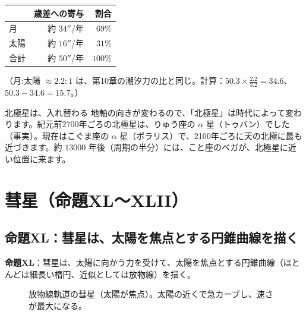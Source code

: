 \documentclass[a4paper,11pt,openany]{ltjsbook}
\begin{document}
\begin{center}
\begin{tabular}{lrr}
\toprule
 & 歳差への寄与 & 割合\\
\midrule
月 & 約 $34''$/年 & $69\%$\\
太陽 & 約 $16''$/年 & $31\%$\\
合計 & 約 $50''$/年 & $100\%$\\
\bottomrule
\end{tabular}
\end{center}

（月:太陽 $\approx2.2:1$ は、第10章の潮汐力の比と同じ。計算：$50.3\times\frac{2.2}{3.2}=34.6$、$50.3-34.6=15.7$。）

\begin{examplebox}{北極星は、入れ替わる}
地軸の向きが変わるので、「北極星」は時代によって変わります。紀元前2700年ごろの北極星は、りゅう座の $\alpha$ 星（トゥバン）でした（事実）。現在はこぐま座の $\alpha$ 星（ポラリス）で、2100年ごろに天の北極に最も近づきます。約 $13000$ 年後（周期の半分）には、こと座のベガが、北極星に近い位置に来ます。
\end{examplebox}

\section{彗星（命題XL〜XLII）}

\subsection{命題XL：彗星は、太陽を焦点とする円錐曲線を描く}

\textbf{命題XL}：彗星は、太陽に向かう力を受けて、太陽を焦点とする円錐曲線（ほとんどは細長い楕円、近似としては放物線）を描く。

\begin{figure}[htbp]
\centering
{}
\caption{放物線軌道の彗星（太陽が焦点）。太陽の近くで急カーブし、速さが最大になる。}
\end{figure}
\end{document}
